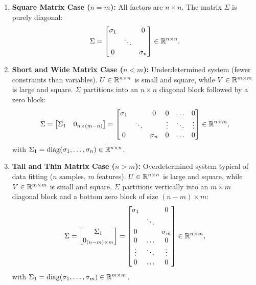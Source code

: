 \begin{enumerate}
    \item \textbf{Square Matrix Case ($n = m$):}
    All factors are $n \times n$. The matrix $\Sigma$ is purely diagonal:
    \begin{equation}
        \Sigma = \begin{bmatrix}
            \sigma_1 & & 0 \\
            & \ddots & \\
            0 & & \sigma_n
        \end{bmatrix} \in \mathbb{R}^{n \times n}.
    \end{equation}

    \item \textbf{Short and Wide Matrix Case ($n < m$):}
    Underdetermined system (fewer constraints than variables). $U \in \mathbb{R}^{n \times n}$ is small and square, while $V \in \mathbb{R}^{m \times m}$ is large and square. $\Sigma$ partitions into an $n \times n$ diagonal block followed by a zero block:
    \begin{equation}
        \Sigma = \begin{bmatrix} \Sigma_1 & 0_{n \times (m - n)} \end{bmatrix} = \begin{bmatrix}
            \sigma_1 & & 0 & 0 & \dots & 0 \\
            & \ddots & & \vdots & \ddots & \vdots \\
            0 & & \sigma_n & 0 & \dots & 0
        \end{bmatrix} \in \mathbb{R}^{n \times m},
    \end{equation}
    with $\Sigma_1 = \operatorname{diag}(\sigma_1, \dots, \sigma_n) \in \mathbb{R}^{n \times n}$.

    \item \textbf{Tall and Thin Matrix Case ($n > m$):}
    Overdetermined system typical of data fitting ($n$ samples, $m$ features). $U \in \mathbb{R}^{n \times n}$ is large and square, while $V \in \mathbb{R}^{m \times m}$ is small and square. $\Sigma$ partitions vertically into an $m \times m$ diagonal block and a bottom zero block of size $(n - m) \times m$:
    \begin{equation}
        \Sigma = \begin{bmatrix} \Sigma_1 \\ 0_{(n - m) \times m} \end{bmatrix} = \begin{bmatrix}
            \sigma_1 & & 0 \\
            & \ddots & \\
            0 & & \sigma_m \\
            0 & \dots & 0 \\
            \vdots & \ddots & \vdots \\
            0 & \dots & 0
        \end{bmatrix} \in \mathbb{R}^{n \times m},
    \end{equation}
    with $\Sigma_1 = \operatorname{diag}(\sigma_1, \dots, \sigma_m) \in \mathbb{R}^{m \times m}$.
\end{enumerate}

